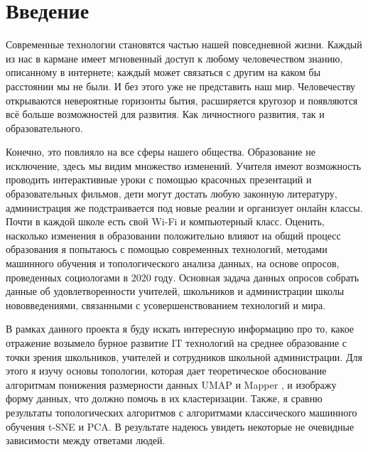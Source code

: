 \section{Введение} \label{sec:intro}

Современные технологии становятся частью нашей повседневной жизни. 
Каждый из нас в кармане имеет мгновенный доступ к любому человечеством знанию, описанному в интернете; каждый может связаться с другим на каком бы расстоянии мы не были. И без этого уже не представить наш мир. 
Человечеству открываются невероятные горизонты бытия, расширяется кругозор и появляются всё больше возможностей для развития. 
Как личностного развития, так и образовательного.

Конечно, это повлияло на все сферы нашего общества. 
Образование не исключение, здесь мы видим множество изменений. 
Учителя имеют возможность проводить интерактивные уроки с помощью красочных презентаций и образовательных фильмов, дети могут достать любую законную литературу, администрация же подстраивается под новые реалии и организует онлайн классы. 
Почти в каждой школе есть свой Wi-Fi и компьютерный класс. 
Оценить, насколько изменения в образовании положительно влияют на общий процесс образования я попытаюсь с помощью современных технологий, методами машинного обучения и топологического анализа данных, на основе опросов, проведенных социологами в 2020 году. 
Основная задача данных опросов собрать данные об удовлетворенности учителей, школьников и администрации школы нововведениями, связанными с усовершенствованием технологий и мира.

В рамках данного проекта я буду искать интересную информацию про то, какое отражение возымело бурное развитие IT технологий на среднее образование с точки зрения школьников, учителей и сотрудников школьной администрации.
Для этого я изучу основы топологии, которая дает теоретическое обоснование алгоритмам понижения размерности данных UMAP \cite{umap} и Mapper \cite{mapper}, и изображу форму данных, что должно помочь в их кластеризации.
Также, я сравню результаты топологических алгоритмов с алгоритмами классического машинного обучения t-SNE \cite{tsne} и PCA.
В результате надеюсь увидеть некоторые не очевидные зависимости между ответами людей.


